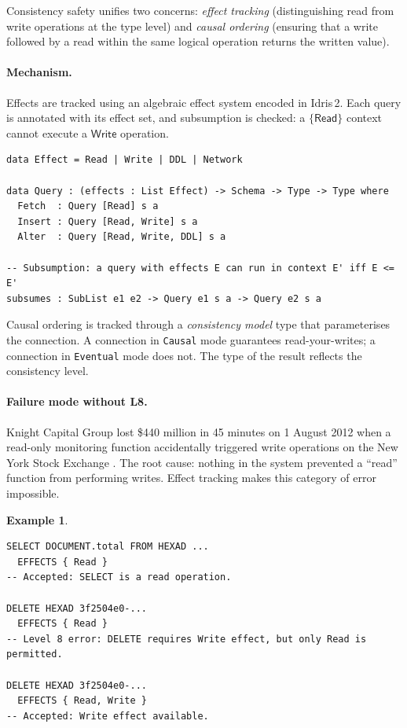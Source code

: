 \documentclass[11pt,a4paper]{article}
\newtheorem{example}[theorem]{Example}
\newcommand{\LevelN}[1]{\textsf{L#1}}
\begin{document}
Consistency safety unifies two concerns: \emph{effect tracking}
(distinguishing read from write operations at the type level) and
\emph{causal ordering} (ensuring that a write followed by a read within
the same logical operation returns the written value).

\paragraph{Mechanism.}
Effects are tracked using an algebraic effect system encoded in Idris\,2.
Each query is annotated with its effect set, and subsumption is checked:
a $\{\mathsf{Read}\}$ context cannot execute a $\mathsf{Write}$
operation.

\begin{lstlisting}[language=Idris2]
data Effect = Read | Write | DDL | Network

data Query : (effects : List Effect) -> Schema -> Type -> Type where
  Fetch  : Query [Read] s a
  Insert : Query [Read, Write] s a
  Alter  : Query [Read, Write, DDL] s a

-- Subsumption: a query with effects E can run in context E' iff E <= E'
subsumes : SubList e1 e2 -> Query e1 s a -> Query e2 s a
\end{lstlisting}

Causal ordering is tracked through a \emph{consistency model} type that
parameterises the connection.  A connection in \texttt{Causal} mode
guarantees read-your-writes; a connection in \texttt{Eventual} mode
does not.  The type of the result reflects the consistency level.

\paragraph{Failure mode without \LevelN{8}.}
Knight Capital Group lost \$440 million in 45 minutes on 1 August 2012
when a read-only monitoring function accidentally triggered write
operations on the New York Stock Exchange \citep{sec2013knight}.  The
root cause: nothing in the system prevented a ``read'' function from
performing writes.  Effect tracking makes this category of error
impossible.

\begin{example}
\begin{lstlisting}[language=VCL]
SELECT DOCUMENT.total FROM HEXAD ...
  EFFECTS { Read }
-- Accepted: SELECT is a read operation.

DELETE HEXAD 3f2504e0-...
  EFFECTS { Read }
-- Level 8 error: DELETE requires Write effect, but only Read is permitted.

DELETE HEXAD 3f2504e0-...
  EFFECTS { Read, Write }
-- Accepted: Write effect available.
\end{lstlisting}
\end{example}
\end{document}
